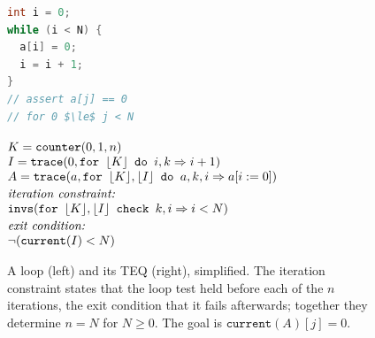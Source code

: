 \documentclass[runningheads]{llncs}
\newcommand{\lf}[1]{\lfloor #1 \rfloor}
\newcommand{\code}[1]{\texttt{#1}}
\begin{document}
\begin{figure}[t]
\begin{minipage}[t]{0.31\textwidth}
\vspace{0pt}
\begin{lstlisting}[language=C,basicstyle=\ttfamily\footnotesize,aboveskip=0pt]
int i = 0;
while (i < N) {
  a[i] = 0;
  i = i + 1;
}
// assert a[j] == 0
// for 0 $\le$ j < N
\end{lstlisting}
\end{minipage}%
\begin{minipage}[t]{0.69\textwidth}
\footnotesize
\vspace{0pt}
$\begin{array}[t]{@{}l@{}}
K = \code{counter}(0, 1, n)\\
I = \code{trace}(0, \code{for } \lf{K} \code{ do } i, k \Rightarrow i + 1)\\
A = \code{trace}(a, \code{for } \lf{K}, \lf{I} \code{ do } a, k, i \Rightarrow a[i := 0])\\[2pt]
\text{\emph{iteration constraint:}}\\
\code{invs}(\code{for } \lf{K}, \lf{I} \code{ check } k, i \Rightarrow i < N)\\[2pt]
\text{\emph{exit condition:}}\\
\neg(\code{current}(I) < N)
\end{array}$
\end{minipage}
\caption{A loop (left) and its \ac{TEQ} (right), simplified. The iteration constraint states that
the loop test held before each of the $n$ iterations, the exit condition that it fails afterwards;
together they determine $n = N$ for $N \ge 0$. The goal is $\code{current}(A)[j] = 0$.}
\label{fig:example}
\end{figure}
\end{document}

